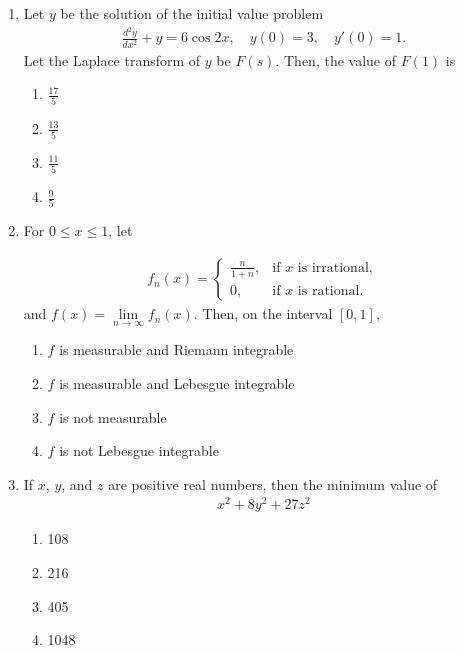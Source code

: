 \documentclass[journal]{IEEEtran}
\numberwithin{equation}{enumi}
\numberwithin{figure}{enumi}
\begin{document}
\begin{enumerate}
\item Let $y$ be the solution of the initial value problem
\hfill{}
\begin{align*}
\frac{d^2 y}{d x^2} + y = 6 \cos 2x,\quad y(0) = 3,\quad y'(0) = 1.
\end{align*}
Let the Laplace transform of $y$ be $F(s)$. Then, the value of $F(1)$ is\\
\begin{multicols}{4}
\begin{enumerate}
\item  $\frac{17}{5}$ \hspace{2cm}
\item  $\frac{13}{5}$ \hspace{2cm}
\item  $\frac{11}{5}$ \hspace{2cm}
\item  $\frac{9}{5}$
\end{enumerate}
\end{multicols}


\item For $0 \leq x \leq 1$, let   \hfill{}

\begin{align*}
f_n(x) =
\begin{cases}
\frac{n}{1+n}, & \text{if $x$ is irrational}, \\
0, & \text{if $x$ is rational}.
\end{cases}
\end{align*}
and $f(x) = \lim\limits_{n \to \infty} f_n(x)$.
Then, on the interval $[0,1]$,\\
\begin{enumerate}
    \item $f$ is measurable and Riemann integrable
    \item $f$ is measurable and Lebesgue integrable
    \item $f$ is not measurable
    \item $f$ is not Lebesgue integrable
\end{enumerate}




\item If $x$, $y$, and $z$ are positive real numbers, then the minimum value of \hfill{}
\begin{align*}
 x^2 + 8y^2 + 27z^2
\end{align*}
\begin{multicols}{4}
\begin{enumerate}
    \item  108 \hspace{2cm}
    \item  216 \hspace{2cm}
    \item  405 \hspace{2cm}
    \item  1048
\end{enumerate}
\end{multicols}
  


\end{enumerate}
\end{document}
